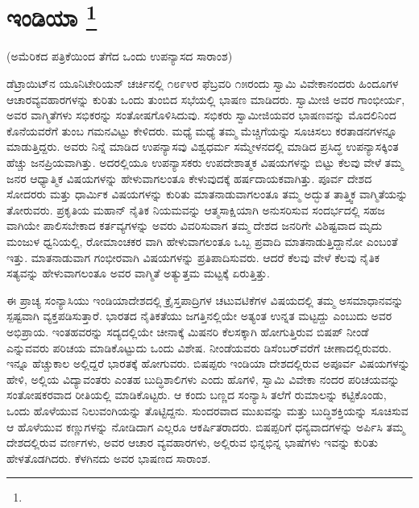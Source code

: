 
\chapter[ಇಂಡಿಯಾ ]{ಇಂಡಿಯಾ \protect\footnote{}}

\centerline{(ಅಮೆರಿಕದ ಪತ್ರಿಕೆಯಿಂದ ತೆಗೆದ ಒಂದು ಉಪನ್ಯಾಸದ ಸಾರಾಂಶ)}

ಡೆಟ್ರಾಯಿಟ್​ನ ಯೂನಿಟೇರಿಯನ್​ ಚರ್ಚಿನಲ್ಲಿ ೧೮೯೪ರ ಫೆಬ್ರವರಿ ೧೫ರಂದು ಸ್ವಾಮಿ ವಿವೇಕಾನಂದರು ಹಿಂದೂಗಳ ಆಚಾರವ್ಯವಹಾರಗಳನ್ನು ಕುರಿತು ಒಂದು ತುಂಬಿದ ಸಭೆಯಲ್ಲಿ ಭಾಷಣ ಮಾಡಿದರು. ಸ್ವಾಮೀಜಿ ಅವರ ಗಾಂಭೀರ್ಯ, ಅವರ ವಾಗ್ಮಿತೆಗಳು ಸಭಿಕರನ್ನು ಸಂತೋಷಗೊಳಿಸಿದುವು. ಸಭಿಕರು ಸ್ವಾಮೀಜಿಯವರ ಭಾಷಣವನ್ನು ಮೊದಲಿನಿಂದ ಕೊನೆಯವರೆಗೆ ತುಂಬ ಗಮನವಿಟ್ಟು ಕೇಳಿದರು. ಮಧ್ಯೆ ಮಧ್ಯೆ ತಮ್ಮ ಮೆಚ್ಚಿಗೆಯನ್ನು ಸೂಚಿಸಲು ಕರತಾಡನಗಳನ್ನೂ ಮಾಡುತ್ತಿದ್ದರು. ಅವರು ನಿನ್ನೆ ಮಾಡಿದ ಉಪನ್ಯಾಸವು ವಿಶ್ವಧರ್ಮ ಸಮ್ಮೇಳನದಲ್ಲಿ ಮಾಡಿದ ಪ್ರಸಿದ್ಧ ಉಪನ್ಯಾಸಕ್ಕಿಂತ ಹೆಚ್ಚು ಜನಪ್ರಿಯವಾಗಿತ್ತು. ಅದರಲ್ಲಿಯೂ ಉಪನ್ಯಾಸಕರು ಉಪದೇಶಾತ್ಮಕ ವಿಷಯಗಳನ್ನು ಬಿಟ್ಟು ಕೆಲವು ವೇಳೆ ತಮ್ಮ ಜನರ ಆಧ್ಯಾತ್ಮಿಕ ವಿಷಯಗಳನ್ನು ಹೇಳುವಾಗಲಂತೂ ಕೇಳುವುದಕ್ಕೆ ಹರ್ಷದಾಯಕವಾಗಿತ್ತು. ಪೂರ್ವ ದೇಶದ ಸೋದರರು ಮತ್ತು ಧಾರ್ಮಿಕ ವಿಷಯಗಳನ್ನು ಕುರಿತು ಮಾತನಾಡುವಾಗಲಂತೂ ತಮ್ಮ ಅದ್ಭುತ ತಾತ್ತ್ವಿಕ ವಾಗ್ಮಿತೆಯನ್ನು ತೋರುವರು. ಪ್ರಕೃತಿಯ ಮಹಾನ್​ ನೈತಿಕ ನಿಯಮವನ್ನು ಆತ್ಮಸಾಕ್ಷಿಯಾಗಿ ಅನುಸರಿಸುವ ಸಂದರ್ಭದಲ್ಲಿ ಸಹಜ ವಾಗಿಯೇ ಪಾಲಿಸಬೇಕಾದ ಕರ್ತವ್ಯಗಳನ್ನು ಅವರು ವಿವರಿಸುವಾಗ ತಮ್ಮ ದೇಶದ ಜನರಿಗೇ ವಿಶಿಷ್ಟವಾದ ಮೃದು ಮಂಜುಳ ಧ್ವನಿಯಲ್ಲಿ, ರೋಮಾಂಚಕರ ವಾಗಿ ಹೇಳುವಾಗಲಂತೂ ಒಬ್ಬ ಪ್ರವಾದಿ ಮಾತನಾಡುತ್ತಿದ್ದಾನೋ ಎಂಬಂತೆ ಇತ್ತು. ಮಾತನಾಡುವಾಗ ಗಂಭೀರವಾಗಿ ವಿಷಯಗಳನ್ನು ಪ್ರತಿಪಾದಿಸುವರು. ಆದರೆ ಕೆಲವು ವೇಳೆ ಕೆಲವು ನೈತಿಕ ಸತ್ಯವನ್ನು ಹೇಳುವಾಗಲಂತೂ ಅವರ ವಾಗ್ಮಿತೆ ಅತ್ಯುತ್ತಮ ಮಟ್ಟಕ್ಕೆ ಏರುತ್ತಿತ್ತು.

ಈ ಪ್ರಾಚ್ಯ ಸಂನ್ಯಾಸಿಯು ಇಂಡಿಯಾದೇಶದಲ್ಲಿ ಕ್ರೈಸ್ತಪಾದ್ರಿಗಳ ಚಟುವಟಿಕೆಗಳ ವಿಷಯದಲ್ಲಿ ತಮ್ಮ ಅಸಮಾಧಾನವನ್ನು ಸ್ಪಷ್ಟವಾಗಿ ವ್ಯಕ್ತಪಡಿಸುತ್ತಾರೆ. ಭಾರತದ ನೈತಿಕತೆಯು ಜಗತ್ತಿನಲ್ಲಿಯೇ ಅತ್ಯಂತ ಉನ್ನತ ಮಟ್ಟದ್ದು ಎಂಬುದು ಅವರ ಅಭಿಪ್ರಾಯ. ಇಂತಹವರನ್ನು ಸದ್ಯದಲ್ಲಿಯೇ ಚೀನಾಕ್ಕೆ ಮಿಷನರಿ ಕೆಲಸಕ್ಕಾಗಿ ಹೋಗುತ್ತಿರುವ ಬಿಷಪ್​ ನೀಂಡೆ ಎನ್ನುವವರು ಪರಿಚಯ ಮಾಡಿಕೊಟ್ಟುದು ಒಂದು ವಿಶೇಷ. ನೀಂಡೆಯವರು ಡಿಸೆಂಬರ್​ವರೆಗೆ ಚೀಣಾದಲ್ಲಿರುವರು. ಇನ್ನೂ ಹೆಚ್ಚುಕಾಲ ಅಲ್ಲಿದ್ದರೆ ಭಾರತಕ್ಕೆ ಹೋಗುವರು. ಬಿಷಪ್ಪರು ಇಂಡಿಯಾ ದೇಶದಲ್ಲಿರುವ ಅಪೂರ್ವ ವಿಷಯಗಳನ್ನು ಹೇಳಿ, ಅಲ್ಲಿಯ ವಿದ್ಯಾವಂತರು ಎಂತಹ ಬುದ್ಧಿಶಾಲಿಗಳು ಎಂದು ಹೊಗಳಿ, ಸ್ವಾಮಿ ವಿವೇಕಾ ನಂದರ ಪರಿಚಯವನ್ನು ಸಂತೋಷಕರವಾದ ರೀತಿಯಲ್ಲಿ ಮಾಡಿಕೊಟ್ಟರು. ಆ ಕಂದು ಬಣ್ಣದ ಸಂನ್ಯಾಸಿ ತಲೆಗೆ ರುಮಾಲನ್ನು ಕಟ್ಟಿಕೊಂಡು, ಒಂದು ಹೊಳೆಯುವ ನಿಲುವಂಗಿಯನ್ನು ತೊಟ್ಟಿದ್ದನು. ಸುಂದರವಾದ ಮುಖವನ್ನು ಮತ್ತು ಬುದ್ಧಿಶಕ್ತಿಯನ್ನು ಸೂಚಿಸುವ ಆ ಹೊಳೆಯುವ ಕಣ್ಣುಗಳನ್ನು ನೋಡಿದಾಗ ಎಲ್ಲರೂ ಆಕರ್ಷಿತರಾದರು. ಬಿಷಪ್ಪರಿಗೆ ಧನ್ಯವಾದಗಳನ್ನು ಅರ್ಪಿಸಿ ತಮ್ಮ ದೇಶದಲ್ಲಿರುವ ವರ್ಣಗಳು, ಅವರ ಆಚಾರ ವ್ಯವಹಾರಗಳು, ಅಲ್ಲಿರುವ ಭಿನ್ನಭಿನ್ನ ಭಾಷೆಗಳು ಇವನ್ನು ಕುರಿತು ಹೇಳತೊಡಗಿದರು. ಕೆಳಗಿನದು ಅವರ ಭಾಷಣದ ಸಾರಾಂಶ.

